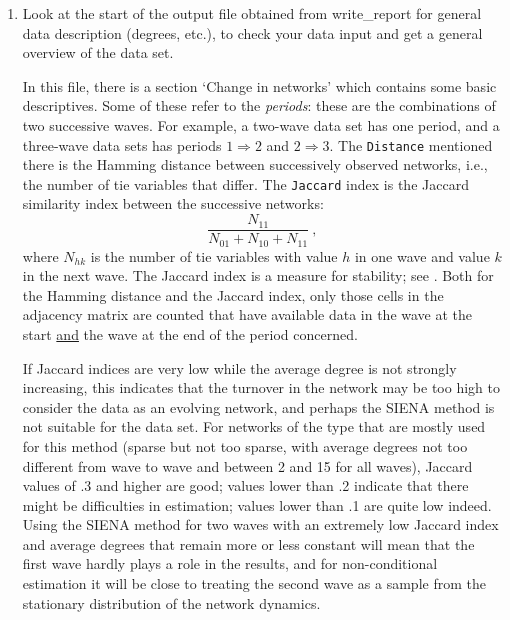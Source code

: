 \documentclass[a4paper,fleqn,11pt]{article}
\newcommand{\+}{\, + \,}
\newcommand{\sfn}[1]{\textsf{#1}}
\newcommand{\SI}{{\sf SIENA }}
\begin{document}
\begin{enumerate}
\item Look at the start of the output file obtained from
       \sfn{write\_report} for general data
      description (degrees, etc.), to check your data input
      and get a general overview of the data set.

      In this file, there is a section `Change in networks' which contains
      some basic descriptives. Some of these refer to the \emph{periods}:
      these are the combinations of two successive waves.
      For example, a two-wave data set has one period, and a
      three-wave data sets has periods $1 \Rightarrow 2$ and $2 \Rightarrow 3$.
      The \texttt{Distance} mentioned there
      is the Hamming distance between successively observed networks, i.e.,
      the number of tie variables that differ.
      The \texttt{Jaccard} index is the Jaccard similarity index between the
      successive networks:
      \[
         \frac{N_{11}}{N_{01}+N_{10}+N_{11}} \ ,
      \]
      where $N_{hk}$ is the number of tie variables with value $h$ in one
      wave and value $k$ in the next wave. The Jaccard index is a measure for
      stability; see \citet{SnijdersEA10b}.
      Both for the Hamming distance and the Jaccard index, only those cells
      in the adjacency matrix are counted that have available data in the wave
      at the start \underline{and} the wave at the end of the period concerned.

      If Jaccard indices are very low while the average
      degree is not strongly increasing, this indicates
      that the turnover in the network may be too high to consider
      the data as an evolving network, and perhaps the \SI method
      is not suitable for the data set.
      For networks of the type that are mostly used for this method
      (sparse but not too sparse,
      with average degrees not too different from wave to wave
      and between 2 and 15 for all waves),
      Jaccard values of .3 and higher
      are good; values lower than .2 indicate that there might be difficulties
      in estimation; values lower than .1 are quite low indeed.
      Using the \SI method for two waves with an extremely low Jaccard
      index and average degrees that remain more or less constant
      will mean that the first wave hardly plays a role in the results, and
      for non-conditional estimation it will be close to treating the second wave as
      a sample from the stationary distribution of the network dynamics.


\end{enumerate}
\end{document}
